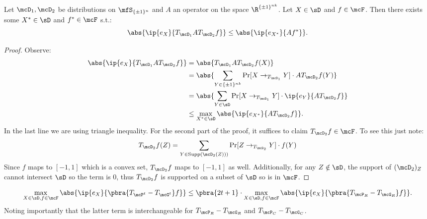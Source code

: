 \begin{claim}\label{claim:sandwiching}
    Let $\mcD_1, \mcD_2$ be distributions on $\mfS_{\{\pm1\}^{n}}$ and $A$ an operator on the space $\R^{\{\pm1\}^{nk}}$. Let $X \in \sD$ and $f \in \mcF$. Then there exists some $X^* \in \sD$ and $f^* \in \mcF$ s.t.:
    \begin{equation*}
        \abs{\ip{e_X}{T_{\mcD_1}AT_{\mcD_2} f}} \leq \abs{\ip{e_{X^*}}{Af^*}}.
    \end{equation*}
\end{claim}
\begin{proof} Observe:
\begin{align*}
    \abs{\ip{e_X}{T_{\mcD_1}AT_{\mcD_2} f}} &= \abs{T_{\mcD_1}AT_{\mcD_2} f(X)}\\
    &= \abs{\sum_{Y \in \{\pm1\}^{nk}} \Pr[X \to_{T_{\mcD_1}} Y] \cdot AT_{\mcD_2} f(Y)}\\
    &= \abs{\sum_{Y \in \sD} \Pr[X \to_{T_{\mcD_1}} Y] \cdot \ip{e_Y}{AT_{\mcD_2} f}}\\
    &\leq \max_{X^* \in \sD} \abs{\ip{e_{X^*}}{AT_{\mcD_2} f}}.
\end{align*}
In the last line we are using triangle inequality. For the second part of the proof, it suffices to claim $T_{\mcD_2}f \in \mcF$. To see this just note:
\begin{equation*}
    T_{\mcD_2}f(Z) = \sum_{Y \in \mathrm{Supp}(\mcD_2(Z)))} \Pr[Z \to_{T_{\mcD_2}} Y] \cdot f(Y)
\end{equation*}
Since $f$ maps to $[-1, 1]$ which is a convex set, $T_{\mcD_2}f$ maps to $[-1, 1]$ as well. Additionally, for any $Z \notin \sD$, the support of $(\mcD_2)_Z$ cannot intersect $\sD$ so the term is 0, thus $T_{\mcD_2}f$ is supported on a subset of $\sD$ so is in $\mcF$. \end{proof}


\begin{claim}
    \begin{equation*}
        \max_{X \in \sD, f \in \mcF} \abs{\ip{e_X}{\pbra{T_{\mcP^t} - T_{\mcG^t}} f}} \leq \pbra{2t+1} \cdot \max_{X \in \sD, f \in \mcF} \abs{\ip{e_X}{\pbra{T_{\mcP_R} - T_{\mcG_R}} f}}.
    \end{equation*}
    Noting importantly that the latter term is interchangeable for $T_{\mcP_R} - T_{\mcG_R}$ and $T_{\mcP_C} - T_{\mcG_C}$. 
\end{claim}

